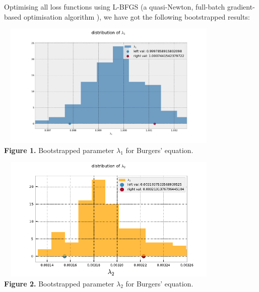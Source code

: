 \documentclass{beamer}
\begin{document}
\begin{frame}

Optimising all loss functions using L-BFGS (a quasi-Newton, full-batch gradient-based optimisation algorithm \cite{Liu1989Nocedal}), we have got the following bootstrapped results:

\begin{center}
\includegraphics[width = 11cm, height = 6cm]{02-presentation-v1/images/bootstrap_l1.pdf}
\\
\caption{\textbf{Figure 1.} Bootstrapped parameter $\lambda_1$ for Burgers' equation.}
\end{center}

\end{frame}

\begin{frame}

\begin{center}
\centering
\includegraphics[width = 11cm, height = 6cm]{02-presentation-v1/images/bootstrap_l2.pdf}
\\
\caption{\textbf{Figure 2.} Bootstrapped parameter $\lambda_2$ for Burgers' equation.}
\end{center}

\end{frame}
\end{document}
